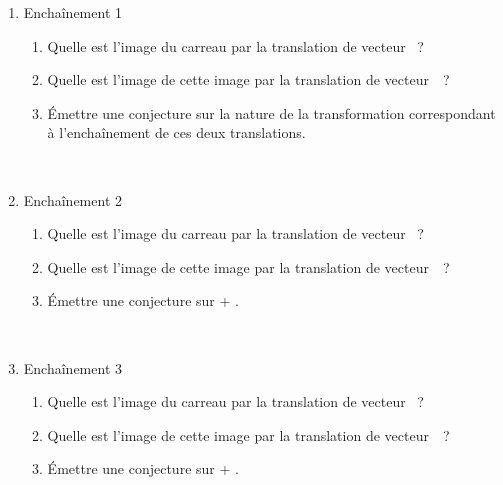 

\newpage

\vspace*{4em}

\begin{enumerate}
	\item Enchaînement 1
	\vspace{-2em}
		\begin{enumerate}
			\item Quelle est l'image du carreau  par la translation de vecteur ~?
			\item Quelle est l'image de cette image par la translation de vecteur~~?
			\item Émettre une conjecture sur la nature de la transformation correspondant à l'enchaînement de ces deux translations.
		\end{enumerate}
\end{enumerate}
	\\[2em]
\begin{enumerate}
	\setcounter{enumi}{1}
	\item Enchaînement 2
	\vspace{-2em}
		\begin{enumerate}
			\item Quelle est l'image du carreau  par la translation de vecteur ~?
			\item Quelle est l'image de cette image par la translation de vecteur~~?
			\item Émettre une conjecture sur  + .
		\end{enumerate}~\\[1em]
	\item Enchaînement 3
	\vspace{-2em}
		\begin{enumerate}
			\item Quelle est l'image du carreau  par la translation de vecteur ~?
			\item Quelle est l'image de cette image par la translation de vecteur~~?
			\item Émettre une conjecture sur  + .
		\end{enumerate}
\end{enumerate}